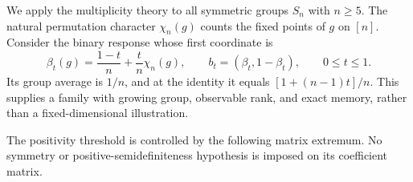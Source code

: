 We apply the multiplicity theory to all symmetric groups $S_n$ with
$n\ge5$. The natural permutation character $\chi_n(g)$ counts the
fixed points of $g$ on $[n]$. Consider the binary response whose first
coordinate is
\begin{equation}\label{eq:r75-symmetric-return}
 \beta_t(g)=\frac{1-t}{n}+\frac{t}{n}\chi_n(g),
 \qquad b_t=(\beta_t,1-\beta_t),\qquad0\le t\le1.
\end{equation}
Its group average is $1/n$, and at the identity it equals
$[1+(n-1)t]/n$. This supplies a family with growing group, observable
rank, and exact memory, rather than a fixed-dimensional illustration.

The positivity threshold is controlled by the following matrix
extremum. No symmetry or positive-semidefiniteness hypothesis is
imposed on its coefficient matrix.

